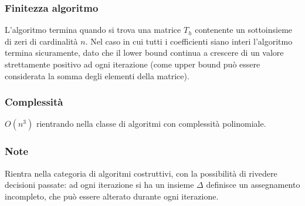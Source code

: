 \documentclass[../template]{subfiles}
\begin{document}
\subsubsection{Finitezza algoritmo}
L'algoritmo termina quando si trova una matrice $T_h$ contenente un sottoinsieme di zeri di cardinalità $n$.
Nel caso in cui tutti i coefficienti siano interi l'algoritmo termina sicuramente, dato che il lower bound continua a
crescere di un valore strettamente positivo ad ogni iterazione (come upper bound può essere considerata la somma degli
elementi della matrice).

\subsubsection{Complessità}
$O(n^3)$ rientrando nella classe di algoritmi con complessità polinomiale.

\subsubsection{Note}
Rientra nella categoria di algoritmi costruttivi, con la possibilità di rivedere decisioni passate: ad ogni iterazione
si ha un insieme $\Delta$ definisce un assegnamento incompleto, che può essere alterato durante ogni iterazione.
\end{document}
